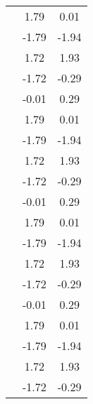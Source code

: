 \begin{table}
\begin{tabular}{c|cc|}
\multicolumn{1}{|c|}{} & \multicolumn{1}{|c|}{      1.79} & \multicolumn{1}{|c|}{      0.01} \\ 
\multicolumn{1}{|c|}{} & \multicolumn{1}{|c|}{     -1.79} & \multicolumn{1}{|c|}{     -1.94} \\ 
\multicolumn{1}{|c|}{} & \multicolumn{1}{|c|}{      1.72} & \multicolumn{1}{|c|}{      1.93} \\ 
\multicolumn{1}{|c|}{} & \multicolumn{1}{|c|}{     -1.72} & \multicolumn{1}{|c|}{     -0.29} \\ 
\multicolumn{1}{|c|}{} & \multicolumn{1}{|c|}{     -0.01} & \multicolumn{1}{|c|}{      0.29} \\ 
\multicolumn{1}{|c|}{} & \multicolumn{1}{|c|}{      1.79} & \multicolumn{1}{|c|}{      0.01} \\ 
\multicolumn{1}{|c|}{} & \multicolumn{1}{|c|}{     -1.79} & \multicolumn{1}{|c|}{     -1.94} \\ 
\multicolumn{1}{|c|}{} & \multicolumn{1}{|c|}{      1.72} & \multicolumn{1}{|c|}{      1.93} \\ 
\multicolumn{1}{|c|}{} & \multicolumn{1}{|c|}{     -1.72} & \multicolumn{1}{|c|}{     -0.29} \\ 
\multicolumn{1}{|c|}{} & \multicolumn{1}{|c|}{     -0.01} & \multicolumn{1}{|c|}{      0.29} \\ 
\multicolumn{1}{|c|}{} & \multicolumn{1}{|c|}{      1.79} & \multicolumn{1}{|c|}{      0.01} \\ 
\multicolumn{1}{|c|}{} & \multicolumn{1}{|c|}{     -1.79} & \multicolumn{1}{|c|}{     -1.94} \\ 
\multicolumn{1}{|c|}{} & \multicolumn{1}{|c|}{      1.72} & \multicolumn{1}{|c|}{      1.93} \\ 
\multicolumn{1}{|c|}{} & \multicolumn{1}{|c|}{     -1.72} & \multicolumn{1}{|c|}{     -0.29} \\ 
\multicolumn{1}{|c|}{} & \multicolumn{1}{|c|}{     -0.01} & \multicolumn{1}{|c|}{      0.29} \\ 
\multicolumn{1}{|c|}{} & \multicolumn{1}{|c|}{      1.79} & \multicolumn{1}{|c|}{      0.01} \\ 
\multicolumn{1}{|c|}{} & \multicolumn{1}{|c|}{     -1.79} & \multicolumn{1}{|c|}{     -1.94} \\ 
\multicolumn{1}{|c|}{} & \multicolumn{1}{|c|}{      1.72} & \multicolumn{1}{|c|}{      1.93} \\ 
\multicolumn{1}{|c|}{} & \multicolumn{1}{|c|}{     -1.72} & \multicolumn{1}{|c|}{     -0.29} \\ 

\end{tabular}
\end{table}
